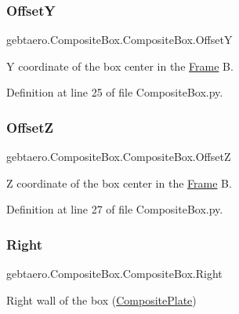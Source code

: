 \subsubsection{\texorpdfstring{OffsetY}{OffsetY}}
{\footnotesize\ttfamily gebtaero.\+Composite\+Box.\+Composite\+Box.\+OffsetY}



Y coordinate of the box center in the \hyperlink{namespacegebtaero_1_1_frame}{Frame} B. 



Definition at line 25 of file Composite\+Box.\+py.

\mbox{\label{classgebtaero_1_1_composite_box_1_1_composite_box_a50e38078e66133a95f34f2d9176329d9}} 
\subsubsection{\texorpdfstring{OffsetZ}{OffsetZ}}
{\footnotesize\ttfamily gebtaero.\+Composite\+Box.\+Composite\+Box.\+OffsetZ}



Z coordinate of the box center in the \hyperlink{namespacegebtaero_1_1_frame}{Frame} B. 



Definition at line 27 of file Composite\+Box.\+py.

\mbox{\label{classgebtaero_1_1_composite_box_1_1_composite_box_a61cdca93cc1f5ef451192395fc50b67b}} 
\subsubsection{\texorpdfstring{Right}{Right}}
{\footnotesize\ttfamily gebtaero.\+Composite\+Box.\+Composite\+Box.\+Right}



Right wall of the box (\hyperlink{namespacegebtaero_1_1_composite_plate}{Composite\+Plate}) 



